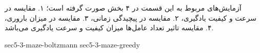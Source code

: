 آزمایش‌های مربوط به این قسمت در ۴ بخش صورت گرفته است؛ ۱. مقایسه در سرعت و کیفیت یادگیری، ۲. مقایسه در پیچیدگی زمانی، ۳. مقایسه در میزان باروری، ۴. مقایسه تاثیر تعداد عامل‌ها میزان کیفیت و سرعت یادگیری می‌باشد.

{sec5-3-maze-boltzmann}
{sec5-3-maze-greedy}